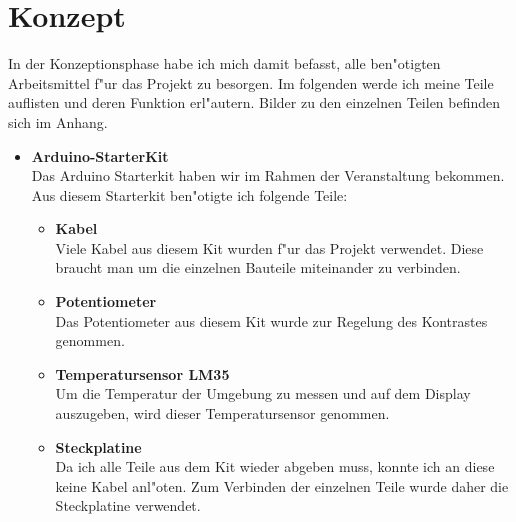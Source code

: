 \documentclass[a4paper]{scrreprt}
\begin{document}
	\chapter{Konzept}
		In der Konzeptionsphase habe ich mich damit befasst, alle ben"otigten Arbeitsmittel 
		f"ur das Projekt zu besorgen.
		Im folgenden werde ich meine Teile auflisten und deren Funktion erl"autern. 
		Bilder zu den einzelnen	Teilen befinden sich im Anhang.
		
		\begin{itemize}
			\item \textbf{Arduino-StarterKit} \\
				Das Arduino Starterkit haben wir im Rahmen der Veranstaltung bekommen.
				Aus diesem Starterkit ben"otigte ich folgende Teile:
				\begin{itemize}					
					\item \textbf{Kabel} \\
					Viele Kabel aus diesem Kit wurden f"ur das Projekt verwendet. 
					Diese braucht man um die einzelnen Bauteile miteinander zu verbinden.
					
					\item \textbf{Potentiometer} \\
					Das Potentiometer aus diesem Kit wurde zur Regelung des Kontrastes 
					genommen. 
					
					\item \textbf{Temperatursensor LM35} \\
					Um die Temperatur der Umgebung zu messen und auf dem Display auszugeben,
					wird dieser Temperatursensor genommen.
					
					\item \textbf{Steckplatine} \\
					Da ich alle Teile aus dem Kit wieder abgeben muss, konnte ich an diese 
					keine Kabel anl"oten. 
					Zum Verbinden der einzelnen Teile wurde daher die Steckplatine verwendet.
				\end{itemize}
				

\end{itemize}
\end{document}
